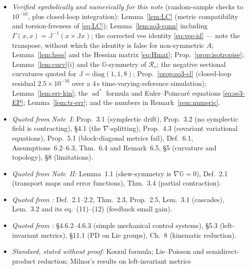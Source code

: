 \documentclass[11pt,a4paper]{article}
\newcommand{\Gm}{\mathbb{G}}
\newcommand{\Jm}{\mathbb{J}}
\newcommand{\Jac}{\mathcal{R}}
\newcommand{\ad}{\operatorname{ad}}
\theoremstyle{plain}
\theoremstyle{definition}
\theoremstyle{remark}
\begin{document}
\section{}
\label{sec:audit}
\vspace{-2\baselineskip}

\begin{itemize}[leftmargin=1.6em,itemsep=3pt]
\item \emph{Verified symbolically and numerically for this note} (random-sample
      checks to $10^{-10}$, plus closed-loop integration):
      Lemma~\ref{lem:LC} (metric compatibility and torsion-freeness of
      \eqref{eq:LC}); Lemma~\ref{lem:so3-conn} including
      $\Gamma(x,x)=\Jm^{-1}(x\times\Jm x)$; the corrected vee identity
      \eqref{eq:vee-id} --- note the transpose, without which the identity is
      false for non-symmetric $A$; Lemma~\ref{lem:hess} and the Hessian matrix
      \eqref{eq:Hmat}; Prop.~\ref{prop:isotropise}; Lemma~\ref{lem:curv}(i) and
      the $\Gm$-symmetry of $\Jac_v$; the negative sectional curvatures quoted for
      $\Jm=\mathrm{diag}(1,1,8)$; Prop.~\ref{prop:so3-cl} (closed-loop residual
      $2.5\times10^{-16}$ over a $4\,$s time-varying-reference simulation);
      Lemma~\ref{lem:err-kin}; the $\ad^{*}$ formula and Euler--Poincar\'e
      equations \eqref{eq:se3-EP}; Lemma~\ref{lem:tr-err}; and the numbers in
      Remark~\ref{rem:numeric}.
\item \emph{Quoted from Note~I:} Prop.~3.1 (symplectic drift), Prop.~3.2 (no
      symplectic field is contracting), \S4.1 (the $\nabla$-splitting), Prop.~4.3
      (covariant variational equations), Prop.~5.1 (block-diagonal metrics fail),
      Def.~6.1, Assumptions~6.2--6.3, Thm.~6.4 and Remark~6.5, \S5 (curvature and
      topology), \S8 (limitations).
\item \emph{Quoted from Note~II:} Lemma~1.1 (skew-symmetry is $\nabla\Gm=0$),
      Def.~2.1 (transport maps and error functions), Thm.~3.4 (partial contraction).
\item \emph{Quoted from \cite{SB13}:} Def.~2.1--2.2, Thm.~2.3, Prop.~2.5,
      Lem.~3.1 (cascades), Lem.~3.2 and its eq.~(11)--(12) (feedback small gain).
\item \emph{Quoted from \cite{BL04}:} \S4.6.2--4.6.3 (simple mechanical control
      systems), \S5.3 (left-invariant metrics), \S11.1 (PD on Lie groups), Ch.~8
      (kinematic reduction).
\item \emph{Standard, stated without proof:} Koszul formula; Lie--Poisson and
      semidirect-product reduction; Milnor's results on left-invariant metrics

\end{itemize}
\end{document}
